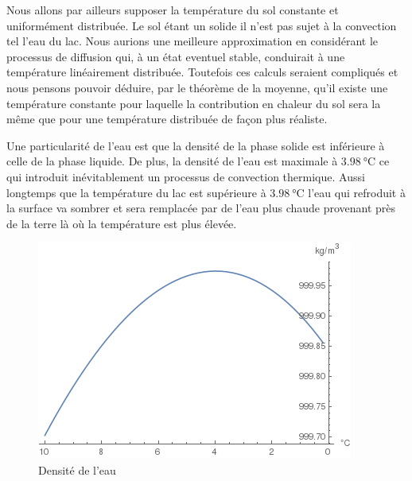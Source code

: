 \documentclass[12pt]{article}
\begin{document}
Nous allons par ailleurs supposer la temp\'erature du sol constante et uniform\'ement distribu\'ee.
Le sol \'etant un solide il n'est pas sujet \`a la convection tel l'eau du lac. Nous aurions
une meilleure approximation en consid\'erant le processus de diffusion qui, \`a un \'etat eventuel
stable, conduirait \`a une temp\'erature lin\'eairement distribu\'ee\cite{TempLinear}. Toutefois ces calculs seraient
compliqu\'es et nous pensons pouvoir d\'eduire, par le th\'eor\`eme de la moyenne\cite{AvgValue},
qu'il existe une temp\'erature constante pour laquelle la contribution en chaleur du sol sera la
m\^eme que pour une temp\'erature distribu\'ee de fa\c con plus r\'ealiste.

Une particularit\'e de l'eau est que la densit\'e de la phase solide est inf\'erieure \`a celle de
la phase liquide. De plus, la densit\'e de l'eau est maximale \`a
$\SI{3.98}{\celsius}$\cite{WaterDensity} ce qui introduit in\'evitablement un processus de
convection thermique\cite{ConvNat}. Aussi longtemps que la temp\'erature du lac est sup\'erieure \`a
$\SI{3.98}{\celsius}$ l'eau qui refroduit \`a la surface va sombrer et sera remplac\'ee par de l'eau
plus chaude provenant pr\`es de la terre l\`a o\`u la temp\'erature est plus \'elev\'ee.

\begin{figure}
    \centering
    \includegraphics[scale=0.9]{WaterDensity.png}
    \caption{Densit\'e de l'eau}
\end{figure}
\end{document}
